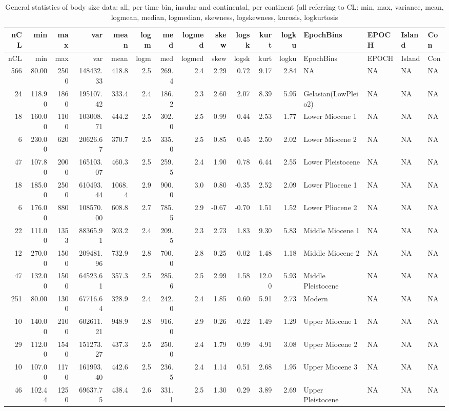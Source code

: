 \documentclass[]{article}
\begin{document}
\begin{longtable}[]{@{}rrrrrrrrrrrrllll@{}}
\caption{General statistics of body size data: all, per time bin,
insular and continental, per continent (all referring to CL: min, max,
variance, mean, logmean, median, logmedian, skewness, logskewness,
kurosis, logkurtosis}\tabularnewline
\toprule
nCL & min & max & var & mean & logm & med & logmed & skew & logsk & kurt
& logku & EpochBins & EPOCH & Island & Con\tabularnewline
\midrule
\endfirsthead
\toprule
nCL & min & max & var & mean & logm & med & logmed & skew & logsk & kurt
& logku & EpochBins & EPOCH & Island & Con\tabularnewline
\midrule
\endhead
566 & 80.00 & 2500 & 148432.33 & 418.8 & 2.5 & 269.4 & 2.4 & 2.29 & 0.72
& 9.17 & 2.84 & NA & NA & NA & NA\tabularnewline
24 & 118.90 & 1860 & 195107.42 & 333.4 & 2.4 & 186.2 & 2.3 & 2.60 & 2.07
& 8.39 & 5.95 & Gelasian(LowPleio2) & NA & NA & NA\tabularnewline
18 & 160.00 & 1100 & 103008.71 & 444.2 & 2.5 & 302.0 & 2.5 & 0.99 & 0.44
& 2.53 & 1.77 & Lower Miocene 1 & NA & NA & NA\tabularnewline
6 & 230.00 & 620 & 20626.67 & 370.7 & 2.5 & 335.0 & 2.5 & 0.85 & 0.45 &
2.50 & 2.02 & Lower Miocene 2 & NA & NA & NA\tabularnewline
47 & 107.80 & 2000 & 165103.07 & 460.3 & 2.5 & 259.5 & 2.4 & 1.90 & 0.78
& 6.44 & 2.55 & Lower Pleistocene & NA & NA & NA\tabularnewline
18 & 185.00 & 2500 & 610493.44 & 1068.4 & 2.9 & 900.0 & 3.0 & 0.80 &
-0.35 & 2.52 & 2.09 & Lower Pliocene 1 & NA & NA & NA\tabularnewline
6 & 176.00 & 880 & 108570.00 & 608.8 & 2.7 & 785.5 & 2.9 & -0.67 & -0.70
& 1.51 & 1.52 & Lower Pliocene 2 & NA & NA & NA\tabularnewline
22 & 111.00 & 1353 & 88365.91 & 303.2 & 2.4 & 209.5 & 2.3 & 2.73 & 1.83
& 9.30 & 5.83 & Middle Miocene 1 & NA & NA & NA\tabularnewline
12 & 270.00 & 1500 & 209481.96 & 732.9 & 2.8 & 700.0 & 2.8 & 0.25 & 0.02
& 1.48 & 1.18 & Middle Miocene 2 & NA & NA & NA\tabularnewline
47 & 132.00 & 1500 & 64523.61 & 357.3 & 2.5 & 285.6 & 2.5 & 2.99 & 1.58
& 12.00 & 5.93 & Middle Pleistocene & NA & NA & NA\tabularnewline
251 & 80.00 & 1300 & 67716.64 & 328.9 & 2.4 & 242.0 & 2.4 & 1.85 & 0.60
& 5.91 & 2.73 & Modern & NA & NA & NA\tabularnewline
10 & 140.00 & 2100 & 602611.21 & 948.9 & 2.8 & 916.0 & 2.9 & 0.26 &
-0.22 & 1.49 & 1.29 & Upper Miocene 1 & NA & NA & NA\tabularnewline
29 & 112.00 & 1540 & 151273.27 & 437.3 & 2.5 & 250.0 & 2.4 & 1.79 & 0.99
& 4.91 & 3.08 & Upper Miocene 2 & NA & NA & NA\tabularnewline
10 & 107.00 & 1170 & 161993.40 & 442.6 & 2.5 & 236.5 & 2.4 & 1.14 & 0.51
& 2.68 & 1.95 & Upper Miocene 3 & NA & NA & NA\tabularnewline
46 & 102.44 & 1250 & 69637.75 & 438.4 & 2.6 & 331.1 & 2.5 & 1.30 & 0.29
& 3.89 & 2.69 & Upper Pleistocene & NA & NA & NA\tabularnewline

\end{longtable}
\end{document}
